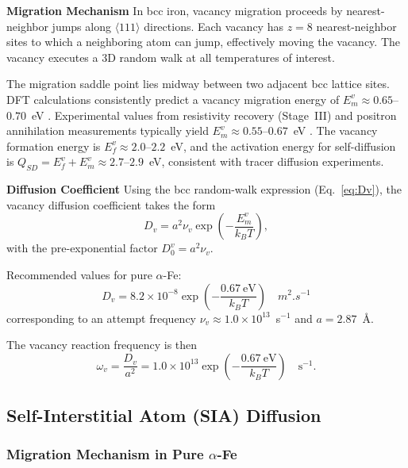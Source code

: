 \documentclass[pdflatex,sn-basic]{sn-jnl} %
\begin{document}
\textbf{Migration Mechanism}
In bcc iron, vacancy migration proceeds by nearest-neighbor jumps along $\langle111\rangle$ directions. Each vacancy has $z=8$ nearest-neighbor sites to which a neighboring atom can jump, effectively moving the vacancy. The vacancy executes a 3D random walk at all temperatures of interest.

The migration saddle point lies midway between two adjacent bcc lattice sites. DFT calculations consistently predict a vacancy migration energy of $E_m^v \approx 0.65$--$0.70$~eV \citep{Domain2001, Fu2004}. Experimental values from resistivity recovery (Stage~III) and positron annihilation measurements typically yield $E_m^v \approx 0.55$--$0.67$~eV \citep{Seeger1998, Ullmaier1991}. The vacancy formation energy is $E_f^v \approx 2.0$--$2.2$~eV, and the activation energy for self-diffusion is $Q_{SD} = E_f^v + E_m^v \approx 2.7$--$2.9$~eV, consistent with tracer diffusion experiments.

\textbf{Diffusion Coefficient}
Using the bcc random-walk expression (Eq.~\ref{eq:Dv}), the vacancy diffusion coefficient takes the form
\begin{equation}\label{eq:Dv_explicit}
    D_v = a^2 \nu_v \exp\!\left(-\frac{E_m^v}{k_B T}\right),
\end{equation}
with the pre-exponential factor $D_0^v = a^2 \nu_v$. 

Recommended values for pure $\alpha$-Fe:
\begin{equation}
    \boxed{D_v = 8.2 \times 10^{-8} \exp\!\left(-\frac{0.67~\text{eV}}{k_B T}\right) \quad \si{m^2.s^{-1}}}
\end{equation}
corresponding to an attempt frequency $\nu_v \approx 1.0 \times 10^{13}$~s$^{-1}$ and $a = 2.87$~\AA.

The vacancy reaction frequency is then
\begin{equation}\label{eq:omega_v_explicit}
    \omega_v = \frac{D_v}{a^2} = 1.0\times 10^{13} \exp\!\left(-\frac{0.67~\text{eV}}{k_B T}\right) \quad \text{s}^{-1}.
\end{equation}

\subsection{Self-Interstitial Atom (SIA) Diffusion}
\label{sec:SIA}

\subsubsection{Migration Mechanism in Pure $\alpha$-Fe}
\end{document}
